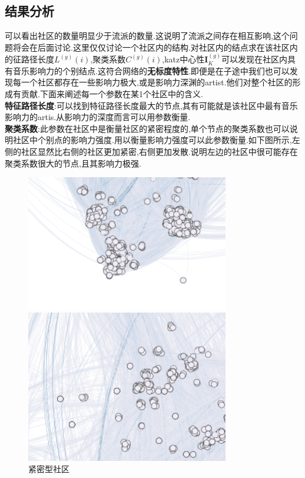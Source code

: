 \documentclass[a4paper,12pt]{article}
\begin{document}
\begin{spacing}{1.2}
		 \subsection{结果分析}
		 可以看出社区的数量明显少于流派的数量.这说明了流派之间存在相互影响,这个问题将会在后面讨论.这里仅仅讨论一个社区内的结构.对社区内的结点求在该社区内的征路径长度$L^{(g)}(i)$,聚类系数$C^{(g)}(i)$,katz中心性$\bm{I}^{(g)}_{K}$可以发现在社区内具有音乐影响力的个别结点.这符合网络的\textbf{无标度特性}.即便是在子途中我们也可以发现每一个社区都存在一些影响力极大,或是影响力深渊的artist.他们对整个社区的形成有贡献.下面来阐述每一个参数在某1个社区中的含义.\\
		 \textbf{特征路径长度}:可以找到特征路径长度最大的节点,其有可能就是该社区中最有音乐影响力的artis.从影响力的深度而言可以用参数衡量.\\
		 \textbf{聚类系数}:此参数在社区中是衡量社区的紧密程度的,单个节点的聚类系数也可以说明社区中个别点的影响力强度.用以衡量影响力强度可以此参数衡量.如下图所示,左侧的社区显然比右侧的社区更加紧密,右侧更加发散.说明左边的社区中很可能存在聚类系数很大的节点,且其影响力极强.
		 \begin{figure}[!ht]
		 	\begin{center}
		 		\begin{minipage}{0.47\linewidth}
		 			\includegraphics[scale=0.5]{c1.png}
		 			\caption{紧密型社区}
		 		\end{minipage}
		 		\begin{minipage}{0.45\linewidth}
		 			\includegraphics[scale=0.47]{c2.png}

\end{minipage}
\end{center}
\end{figure}
\end{spacing}
\end{document}
